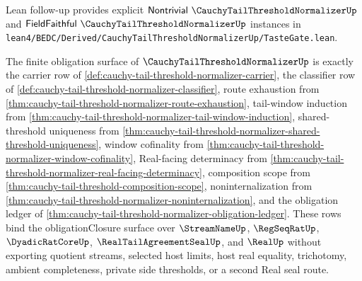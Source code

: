 

Lean follow-up provides explicit $\mathsf{Nontrivial}\ \CauchyTailThresholdNormalizerUp$ and $\mathsf{FieldFaithful}\ \CauchyTailThresholdNormalizerUp$ instances in \texttt{lean4/BEDC/Derived/CauchyTailThresholdNormalizerUp/TasteGate.lean}.

\begin{theorem}
\label{thm:cauchy-tail-threshold-normalizer-obligation-scope}
The finite obligation surface of $\CauchyTailThresholdNormalizerUp$ is exactly the carrier row of \autoref{def:cauchy-tail-threshold-normalizer-carrier}, the classifier row of \autoref{def:cauchy-tail-threshold-normalizer-classifier}, route exhaustion from \autoref{thm:cauchy-tail-threshold-normalizer-route-exhaustion}, tail-window induction from \autoref{thm:cauchy-tail-threshold-normalizer-tail-window-induction}, shared-threshold uniqueness from \autoref{thm:cauchy-tail-threshold-normalizer-shared-threshold-uniqueness}, window cofinality from \autoref{thm:cauchy-tail-threshold-normalizer-window-cofinality}, Real-facing determinacy from \autoref{thm:cauchy-tail-threshold-normalizer-real-facing-determinacy}, composition scope from \autoref{thm:cauchy-tail-threshold-composition-scope}, noninternalization from \autoref{thm:cauchy-tail-threshold-normalizer-noninternalization}, and the obligation ledger of \autoref{thm:cauchy-tail-threshold-normalizer-obligation-ledger}. These rows bind the obligationClosure surface over $\StreamNameUp$, $\RegSeqRatUp$, $\DyadicRatCoreUp$, $\RealTailAgreementSealUp$, and $\RealUp$ without exporting quotient streams, selected host limits, host real equality, trichotomy, ambient completeness, private side thresholds, or a second Real seal route.
\end{theorem}
